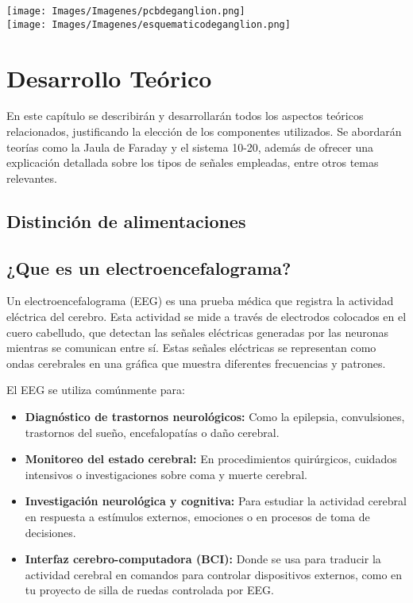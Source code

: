 \documentclass{article}
\begin{document}
\begin{center}
    \texttt{[image: Images/Imagenes/pcbdeganglion.png]}\\

    \texttt{[image: Images/Imagenes/esquematicodeganglion.png]}\\
\end {center}

\section{Desarrollo Teórico}
En este capítulo se describirán y desarrollarán todos los aspectos teóricos relacionados, justificando la elección de los componentes utilizados. Se abordarán teorías como la Jaula de Faraday y el sistema 10-20, además de ofrecer una explicación detallada sobre los tipos de señales empleadas, entre otros temas relevantes.

\subsection{Distinción de alimentaciones}

\subsection{¿Que es un electroencefalograma?}

Un electroencefalograma (EEG) es una prueba médica que registra la actividad eléctrica del cerebro. Esta actividad se mide a través de electrodos colocados en el cuero cabelludo, que detectan las señales eléctricas generadas por las neuronas mientras se comunican entre sí. Estas señales eléctricas se representan como ondas cerebrales en una gráfica que muestra diferentes frecuencias y patrones.

El EEG se utiliza comúnmente para:
\begin{itemize}
    \item \textbf{Diagnóstico de trastornos neurológicos:} Como la epilepsia, convulsiones, trastornos del sueño, encefalopatías o daño cerebral.
    \item \textbf{Monitoreo del estado cerebral:} En procedimientos quirúrgicos, cuidados intensivos o investigaciones sobre coma y muerte cerebral.
    \item \textbf{Investigación neurológica y cognitiva:} Para estudiar la actividad cerebral en respuesta a estímulos externos, emociones o en procesos de toma de decisiones.
    \item \textbf{Interfaz cerebro-computadora (BCI):} Donde se usa para traducir la actividad cerebral en comandos para controlar dispositivos externos, como en tu proyecto de silla de ruedas controlada por EEG.
    
\end{itemize}
\end{document}
